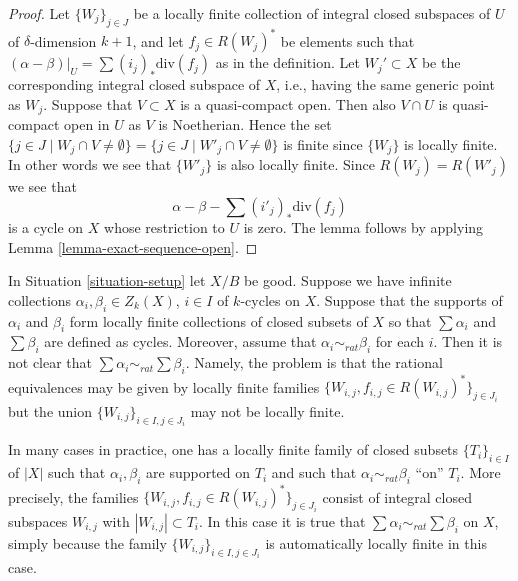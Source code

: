 \begin{proof}
Let $\{W_j\}_{j \in J}$ be a locally finite collection of integral closed
subspaces of $U$ of $\delta$-dimension $k + 1$, and let $f_j \in R(W_j)^*$
be elements such that $(\alpha - \beta)|_U = \sum (i_j)_*\text{div}(f_j)$
as in the definition. Let $W_j' \subset X$ be the corresponding integral
closed subspace of $X$, i.e., having the same generic point as $W_j$.
Suppose that $V \subset X$ is a quasi-compact open.
Then also $V \cap U$ is quasi-compact open in $U$ as $V$ is Noetherian.
Hence the set $\{j \in J \mid W_j \cap V \not = \emptyset\}
= \{j \in J \mid W'_j \cap V \not = \emptyset\}$
is finite since $\{W_j\}$ is locally finite. In other words we see that
$\{W'_j\}$ is also locally finite. Since $R(W_j) = R(W'_j)$ we see
that
$$
\alpha - \beta - \sum (i'_j)_*\text{div}(f_j)
$$
is a cycle on $X$ whose restriction to $U$ is zero.
The lemma follows by applying Lemma \ref{lemma-exact-sequence-open}.
\end{proof}

\begin{remark}
\label{remark-infinite-sums-rational-equivalences}
In Situation \ref{situation-setup} let $X/B$ be good.
Suppose we have infinite collections $\alpha_i, \beta_i \in Z_k(X)$,
$i \in I$ of $k$-cycles on $X$. Suppose that the supports
of $\alpha_i$ and $\beta_i$ form locally finite collections
of closed subsets of $X$ so that $\sum \alpha_i$
and $\sum \beta_i$ are defined as cycles. Moreover, assume that
$\alpha_i \sim_{rat} \beta_i$ for each $i$. Then it is not
clear that $\sum \alpha_i \sim_{rat} \sum \beta_i$. Namely,
the problem is that the rational equivalences may be
given by locally finite
families $\{W_{i, j}, f_{i, j} \in R(W_{i, j})^*\}_{j \in J_i}$
but the union $\{W_{i, j}\}_{i \in I, j\in J_i}$ may not
be locally finite.

\medskip\noindent
In many cases in practice, one has a locally finite family of closed
subsets $\{T_i\}_{i \in I}$ of $|X|$ such that $\alpha_i, \beta_i$
are supported on $T_i$ and such that $\alpha_i \sim_{rat} \beta_i$
``on'' $T_i$. More precisely, the families
$\{W_{i, j}, f_{i, j} \in R(W_{i, j})^*\}_{j \in J_i}$
consist of integral closed subspaces $W_{i, j}$
with $|W_{i, j}| \subset T_i$. In this case it is true that
$\sum \alpha_i \sim_{rat} \sum \beta_i$ on $X$, simply because
the family $\{W_{i, j}\}_{i \in I, j\in J_i}$ is automatically
locally finite in this case.
\end{remark}











